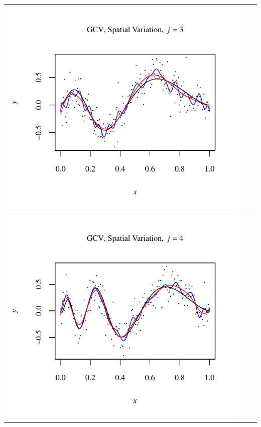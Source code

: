 \documentclass[11pt]{article}
\begin{document}
\begin{table}[h!]
\begin{center}
\begin{tabular}{| >{\centering\arraybackslash}m{2.1in} |  >{\centering\arraybackslash}m{2.1in} |  >{\centering\arraybackslash}m{2.1in}|}
      \includegraphics[width=1\linewidth,height=0.18\textheight]{Graphs/2/3/assignment5_a_2_3_3}\\\hline
      \includegraphics[width=1\linewidth,height=0.18\textheight]{Graphs/2/3/assignment5_a_2_3_4}&

\end{tabular}
\end{center}
\end{table}
\end{document}
